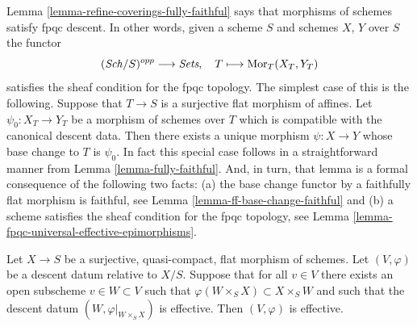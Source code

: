 \begin{remark}
\label{remark-morphisms-of-schemes-satisfy-fpqc-descent}
Lemma \ref{lemma-refine-coverings-fully-faithful}
says that morphisms of schemes satisfy fpqc descent.
In other words, given a scheme $S$ and schemes $X$, $Y$ over $S$
the functor
$$
(\mathit{Sch}/S)^{opp} \longrightarrow \textit{Sets},
\quad
T \longmapsto \mathop{\mathrm{Mor}}\nolimits_T(X_T, Y_T)
$$
satisfies the sheaf condition for the fpqc topology.
The simplest case of this is the following. Suppose that $T \to S$
is a surjective flat morphism of affines. Let $\psi_0 : X_T \to Y_T$
be a morphism of schemes over $T$ which is compatible with the
canonical descent data. Then there exists a unique morphism
$\psi : X \to Y$ whose base change to $T$ is $\psi_0$. In fact this
special case follows in a straightforward manner from
Lemma \ref{lemma-fully-faithful}.
And, in turn, that lemma is a formal consequence of the following
two facts:
(a) the base change functor by a faithfully flat morphism is faithful, see
Lemma \ref{lemma-ff-base-change-faithful}
and (b) a scheme satisfies the sheaf condition for the fpqc topology, see
Lemma \ref{lemma-fpqc-universal-effective-epimorphisms}.
\end{remark}

\begin{lemma}
\label{lemma-effective-for-fpqc-is-local-upstairs}
Let $X \to S$ be a surjective, quasi-compact, flat morphism of
schemes. Let $(V, \varphi)$ be a descent datum relative to $X/S$.
Suppose that for all $v \in V$ there exists an open subscheme
$v \in W \subset V$ such that $\varphi(W \times_S X) \subset X \times_S W$
and such that the descent datum $(W, \varphi|_{W \times_S X})$
is effective. Then $(V, \varphi)$ is effective.
\end{lemma}

